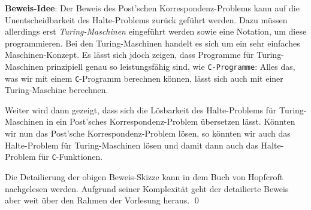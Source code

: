 \noindent
\textbf{Beweis-Idee}:  Der Beweis des Post'schen Korrespondenz-Problems kann auf die
Unentscheidbarkeit des Halte-Problems zur\"uck gef\"uhrt werden.  Dazu m\"ussen allerdings erst
\emph{Turing-Maschinen} eingef\"uhrt werden sowie eine Notation, um diese  programmieren.  
Bei den Turing-Maschinen handelt es sich um ein sehr einfaches
Maschinen-Konzept.  Es l\"asst sich jdoch zeigen, dass Programme f\"ur Turing-Maschinen
prinzipiell genau so leistungsf\"ahig sind, wie \texttt{C-Programme}:
Alles das, was wir mit einem \texttt{C}-Programm berechnen k\"onnen, l\"asst sich auch mit
einer Turing-Maschine berechnen.

Weiter wird dann gezeigt, dass sich die L\"osbarkeit des Halte-Problems f\"ur Turing-Maschinen
in ein Post'sches Korrespondenz-Problem \"ubersetzen l\"asst.  K\"onnten wir nun das Post'sche
Korrespondenz-Problem l\"osen, so k\"onnten wir auch das Halte-Problem f\"ur Turing-Maschinen
l\"osen und damit dann auch das Halte-Problem f\"ur \texttt{C}-Funktionen.

Die Detailierung der obigen Beweis-Skizze kann in dem Buch von Hopfcroft
\cite{hopcroft:06} nachgelesen werden.  Aufgrund seiner Komplexit\"at geht der detailierte 
 Beweis aber weit \"uber den Rahmen der Vorlesung heraus.
\qed


